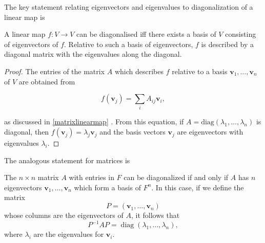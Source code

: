\documentclass[a4paper,12pt]{report}
\begin{document}
The key statement relating eigenvectors and eigenvalues to diagonalization of a linear map is

\begin{lemma}
A linear map \( f : V \to V \) can be diagonalised iff there exists a basis of \( V \) consisting of eigenvectors of \( f \). Relative to such a basis of eigenvectors, \( f \) is described by a diagonal matrix with the eigenvalues along the diagonal.
\end{lemma}

\begin{proof}
The entries of the matrix \( A \) which describes \( f \) relative to a basis \( \mathbf{v}_1, \ldots, \mathbf{v}_n \) of \( V \) are obtained from 

\begin{equation}
    f(\mathbf{v}_j) = \sum_i A_{ij} \mathbf{v}_i,
\end{equation}

as discussed in \cref{matrixlinearmap} . From this equation, if \( A = \text{diag}(\lambda_1, \ldots, \lambda_n) \) is diagonal, then \( f(\mathbf{v}_j) = \lambda_j \mathbf{v}_j \) and the basis vectors \( \mathbf{v}_j \) are eigenvectors with eigenvalues \( \lambda_i \). 
\end{proof}

The analogous statement for matrices is

\begin{lemma} \label{diagonalizable} 
The \( n \times n \) matrix \( A \) with entries in \( F \) can be diagonalized if and only if \( A \) has \( n \) eigenvectors \( \mathbf{v}_1, \ldots, \mathbf{v}_n \) which form a basis of \( F^n \). In this case, if we define the matrix
\begin{equation}
    P = (\mathbf{v}_1, \ldots, \mathbf{v}_n)
\end{equation}
whose columns are the eigenvectors of \( A \), it follows that
\begin{equation}
    P^{-1} A P = \operatorname{diag}(\lambda_1, \ldots, \lambda_n),
\end{equation}
where \( \lambda_i \) are the eigenvalues for \( \mathbf{v}_i \).
\end{lemma}
\end{document}
